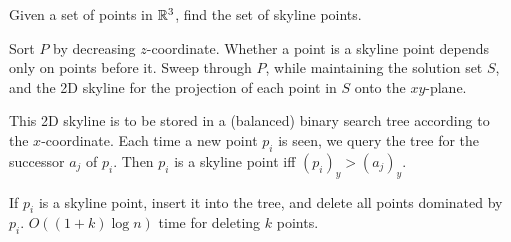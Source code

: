 \begin{question*}
    Given a set of points in $\mathbb{R}^3$, find the set of skyline points.
\end{question*}
\begin{solution}
    Sort $P$ by decreasing $z$-coordinate.
    Whether a point is a skyline point depends only on points before it.
    Sweep through $P$, while maintaining the solution set $S$, and the
    2D skyline for the projection of each point in $S$ onto the $xy$-plane.

    This 2D skyline is to be stored in a (balanced) binary search tree
    according to the $x$-coordinate.
    Each time a new point $p_i$ is seen, we query the tree for the successor
    $a_j$ of $p_i$.
    Then $p_i$ is a skyline point iff $(p_i)_y > (a_j)_y$.

    If $p_i$ is a skyline point, insert it into the tree, and delete all
    points dominated by $p_i$.
    $O((1 + k) \log n)$ time for deleting $k$ points.


\end{solution}
